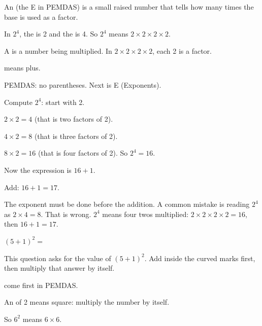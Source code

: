 \begin{words}
  \item An (the E in PEMDAS) is a small raised number that tells how
        many times the base is used as a factor.
  \item In $2^{4}$, the is 2 and the is 4. So $2^{4}$ means
        $2 \times 2 \times 2 \times 2$.
  \item A is a number being multiplied. In $2 \times 2 \times 2 \times 2$, each 2 is a factor.
  \item {}means plus.
\end{words}

\begin{steps}
  \item PEMDAS: no parentheses. Next is E (Exponents).
  \item Compute $2^{4}$: start with 2.
  \item $2 \times 2 = 4$ (that is two factors of 2).
  \item $4 \times 2 = 8$ (that is three factors of 2).
  \item $8 \times 2 = 16$ (that is four factors of 2). So $2^{4} = 16$.
  \item Now the expression is $16 + 1$.
  \item Add: $16 + 1 = 17$.
\end{steps}


The exponent must be done before the addition. A common mistake is reading $2^{4}$
as $2 \times 4 = 8$. That is wrong. $2^{4}$ means four twos multiplied:
$2 \times 2 \times 2 \times 2 = 16$, then $16 + 1 = 17$.


$(5 + 1)^{2} = $\ansblank


This question asks for the value of $(5 + 1)^{2}$. Add inside the curved marks
first, then multiply that answer by itself.

\begin{words}
  \item {}come first in PEMDAS.
  \item An of 2 means square: multiply the number by itself.
  \item So $6^{2}$ means $6 \times 6$.
\end{words}

